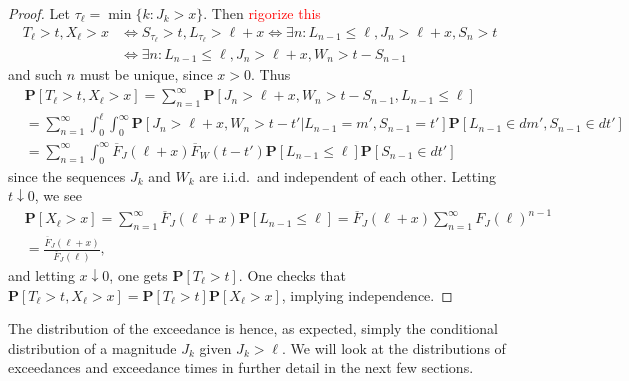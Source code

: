 \documentclass[honours,12pt]{UNSWthesis}
\newcommand{\pr}{\mathbf {P}}
\newcommand{\1}{\mathbf 1}
\numberwithin{equation}{section}
\theoremstyle{definition}
\theoremstyle{remark}
\begin{document}
\begin{proof}
Let $\tau_\ell = \min\{k: J_k > x\}$. Then \textcolor{red}{rigorize this}
\begin{align*}
T_\ell > t, X_\ell > x 
&\Longleftrightarrow
S_{\tau_\ell} > t, L_{\tau_\ell} > \ell + x
\Longleftrightarrow
\exists n: L_{n-1} \le \ell, J_n > \ell + x, S_n > t
\\
&\Longleftrightarrow
\exists n: L_{n-1} \le \ell, J_n > \ell + x, W_n > t - S_{n-1}
\end{align*}
and such $n$ must be unique, since $x > 0$.
Thus 
\begin{align*}
&\pr[T_\ell > t, X_\ell > x]
= \sum_{n=1}^\infty \pr[J_n > \ell + x, W_n > t - S_{n-1}, L_{n-1} \le \ell]
\\
&= \sum_{n=1}^\infty \int_0^\ell \int_0^\infty \pr[J_n > \ell + x, W_n > t - t' | L_{n-1} = m', 
S_{n-1} = t'] \pr[L_{n-1} \in dm', S_{n-1} \in dt']
\\
&= \sum_{n=1}^\infty \int_0^\infty \overline F_J(\ell + x) \overline F_W(t - t')
\pr[L_{n-1} \le \ell] \pr[S_{n-1} \in dt']
\end{align*}
since the sequences $J_k$ and $W_k$ are i.i.d.\ and independent of each other.
Letting $t \downarrow 0$, we see
\begin{align*}
&\pr[X_\ell > x] 
= \sum_{n=1}^\infty \overline F_J(\ell+x) \pr[L_{n-1} \le \ell] 
= \overline F_J(\ell+x) \sum_{n=1}^\infty F_J(\ell)^{n-1}
\\
&= \frac{\overline F_J(\ell + x)}{\overline F_J(\ell)},
\end{align*}
and letting $x \downarrow 0$, one gets $\pr[T_\ell > t]$. 
One checks that $\pr[T_\ell > t, X_\ell > x] = \pr[T_\ell > t] \pr[X_\ell > x]$, implying independence.
\end{proof}
The distribution of the exceedance is hence, as expected, simply the
conditional distribution of a magnitude $J_k$ given $J_k > \ell$. We will look at the distributions of exceedances and exceedance times in further detail in the next few sections.
\end{document}
